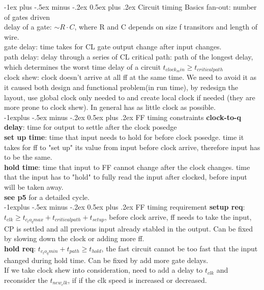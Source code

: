 \documentclass[10pt,landscape]{article}
\makeatletter
\renewcommand{\section}{\@startsection{section}{1}{0mm}%
                                {-1ex plus -.5ex minus -.2ex}%
                                {0.5ex plus .2ex}%
                                {\normalfont\large\bfseries}}
\renewcommand{\subsection}{\@startsection{subsection}{2}{0mm}%
                                {-1explus -.5ex minus -.2ex}%
                                {0.5ex plus .2ex}%
                                {\normalfont\normalsize\bfseries}}
\theoremstyle{definition}
\makeatother
\begin{document}
\begin{multicols}{3}
\section{Circuit timing Basics}
fan-out: number of gates driven \\
delay of a gate: $\sim R \cdot C$, where R and C depends on size f transitors and length of wire.\\
gate delay: time takes for CL gate output change after input changes.  \\
path delay: delay through a series of CL
critical path: path of the longest delay, which determines the worst time delay of a circuit $t_{clock_min} \geq t_{critical path}$ \\
clock shew: clock doesn't arrive at all ff at the same time. We need to avoid it as it caused both design and functional problem(in run time), by redesign the layout, use global clock only needed to and create local clock if needed (they are more prone to clock shew). In general has as little clock as possible. \\
\subsection{FF timing constraints}
\textbf{clock-to-q delay}: time for output to settle after the clock posedge\\
\textbf{set up time}: time that input needs to hold for before clock posedge. time it takes for ff to "set up" its value from input before clock arrive, therefore input has to be the same.\\
\textbf{hold time}: time that input to FF cannot change after the clock changes. time that the input has to "hold" to fully read the input after clocked, before input will be taken away. \\
\textbf{see p5} for a detailed cycle. \\

\subsection{FF timing requirement}
\textbf{setup req}: $t_{clk} \geq t_{c_to_q max} + t_{critical path} + t_{setup}$, before clock arrive, ff needs to take the input, CP is settled and all previous input already stabled in the output. Can be fixed by slowing down the clock or adding more ff. \\
\textbf{hold req}: $t_{c_to_q min} + t_{path} \geq t_{hold}$, the fast circuit cannot be too fast that the input changed during hold time. Can be fixed by add more gate delays. \\
If we take clock shew into consideration, need to add a delay to $t_{clk}$ and reconsider the $t_{new_clk}$, if if the clk speed is increased or decreased. \\


\end{multicols}
\end{document}
